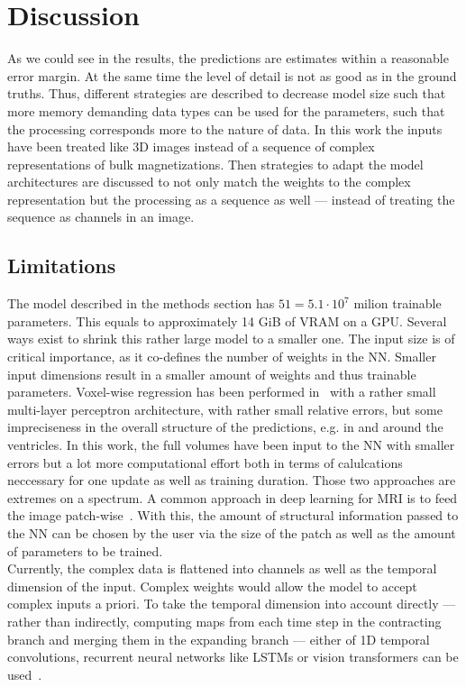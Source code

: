 \chapter{Discussion}\label{\positionnumber}
As we could see in the results, the predictions are estimates within a reasonable error margin.
At the same time the level of detail is not as good as in the ground truths.
Thus, different strategies are described to decrease model size such that more memory demanding data types can be used for the parameters, such that the processing corresponds more to the nature of data.
In this work the inputs have been treated like 3D images instead of a sequence of complex representations of bulk magnetizations.
Then strategies to adapt the model architectures are discussed to not only match the weights to the complex representation but the processing as a sequence as well --- instead of treating the sequence as channels in an image.

\section{Limitations}
The model described in the methods section has $51 = 5.1 \cdot 10^7$ milion trainable parameters.
This equals to approximately 14 GiB of VRAM on a GPU.
Several ways exist to shrink this rather large model to a smaller one.
The input size is of critical importance, as it co-defines the number of weights in the NN.
Smaller input dimensions result in a smaller amount of weights and thus trainable parameters.
Voxel-wise regression has been performed in~\autocite{birk_high-resolution_2022} with a rather small multi-layer perceptron architecture, with rather small relative errors, but some impreciseness in the overall structure of the predictions, e.g. in and around the ventricles.
In this work, the full volumes have been input to the NN with smaller errors but a lot more computational effort both in terms of calulcations neccessary for one update as well as training duration.
Those two approaches are extremes on a spectrum.
A common approach in deep learning for MRI is to feed the image patch-wise~\autocite{perez-garcia_torchio_2021}.
With this, the amount of structural information passed to the NN can be chosen by the user via the size of the patch as well as the amount of parameters to be trained. \\

Currently, the complex data is flattened into channels as well as the temporal dimension of the input.
Complex weights would allow the model to accept complex inputs a priori.
To take the temporal dimension into account directly --- rather than indirectly, computing maps from each time step in the contracting branch and merging them in the expanding branch --- either of 1D temporal convolutions, recurrent neural networks like LSTMs or vision transformers can be used~\autocite{sherstinsky_fundamentals_2020, kustner_cinenet_2020}.

